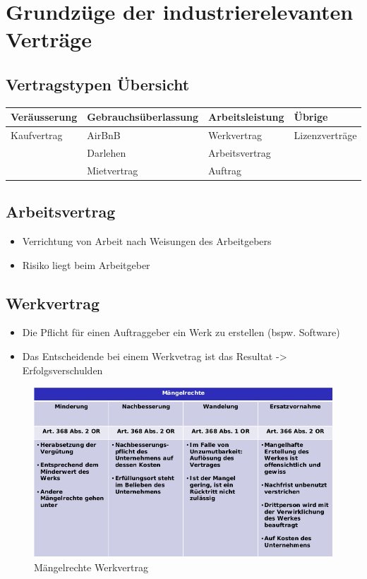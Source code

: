 \hypertarget{grundzuxfcge-der-industrierelevanten-vertruxe4ge}{%
\section{Grundzüge der industrierelevanten
Verträge}\label{grundzuxfcge-der-industrierelevanten-vertruxe4ge}}

\hypertarget{vertragstypen-uxfcbersicht}{%
\subsection{Vertragstypen Übersicht}\label{vertragstypen-uxfcbersicht}}

\begin{longtable}[]{@{}llll@{}}
Veräusserung & Gebrauchsüberlassung & Arbeitsleistung &
Übrige\tabularnewline
\endhead
Kaufvertrag & AirBnB & Werkvertrag & Lizenzverträge\tabularnewline
& Darlehen & Arbeitsvertrag &\tabularnewline
& Mietvertrag & Auftrag &\tabularnewline
\end{longtable}

\hypertarget{arbeitsvertrag}{%
\subsection{Arbeitsvertrag}\label{arbeitsvertrag}}

\begin{itemize}
\tightlist
\item
  Verrichtung von Arbeit nach Weisungen des Arbeitgebers
\item
  Risiko liegt beim Arbeitgeber
\end{itemize}

\hypertarget{werkvertrag}{%
\subsection{Werkvertrag}\label{werkvertrag}}

\begin{itemize}
\tightlist
\item
  Die Pflicht für einen Auftraggeber ein Werk zu erstellen (bspw.
  Software)
\item
  Das Entscheidende bei einem Werkvetrag ist das Resultat
  -\textgreater{} Erfolgsverschulden
\end{itemize}

\begin{figure}
\centering
\includegraphics{figures/maengelRechte.png}
\caption{Mängelrechte Werkvertrag}
\end{figure}

